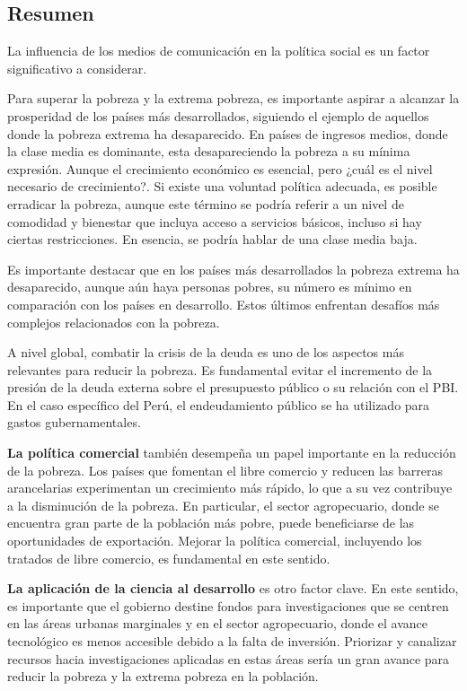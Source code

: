 \documentclass[
  letterpaper,
  DIV=11,
  numbers=noendperiod]{scrartcl}
\begin{document}
\hypertarget{resumen-1}{%
\subsection{Resumen}\label{resumen-1}}

La influencia de los medios de comunicación en la política social es un
factor significativo a considerar.

Para superar la pobreza y la extrema pobreza, es importante aspirar a
alcanzar la prosperidad de los países más desarrollados, siguiendo el
ejemplo de aquellos donde la pobreza extrema ha desaparecido. En países
de ingresos medios, donde la clase media es dominante, esta
desapareciendo la pobreza a su mínima expresión. Aunque el crecimiento
económico es esencial, pero ¿cuál es el nivel necesario de crecimiento?.
Si existe una voluntad política adecuada, es posible erradicar la
pobreza, aunque este término se podría referir a un nivel de comodidad y
bienestar que incluya acceso a servicios básicos, incluso si hay ciertas
restricciones. En esencia, se podría hablar de una clase media baja.

Es importante destacar que en los países más desarrollados la pobreza
extrema ha desaparecido, aunque aún haya personas pobres, su número es
mínimo en comparación con los países en desarrollo. Estos últimos
enfrentan desafíos más complejos relacionados con la pobreza.

A nivel global, combatir la crisis de la deuda es uno de los aspectos
más relevantes para reducir la pobreza. Es fundamental evitar el
incremento de la presión de la deuda externa sobre el presupuesto
público o su relación con el PBI. En el caso específico del Perú, el
endeudamiento público se ha utilizado para gastos gubernamentales.

\textbf{La política comercial} también desempeña un papel importante en
la reducción de la pobreza. Los países que fomentan el libre comercio y
reducen las barreras arancelarias experimentan un crecimiento más
rápido, lo que a su vez contribuye a la disminución de la pobreza. En
particular, el sector agropecuario, donde se encuentra gran parte de la
población más pobre, puede beneficiarse de las oportunidades de
exportación. Mejorar la política comercial, incluyendo los tratados de
libre comercio, es fundamental en este sentido.

\textbf{La aplicación de la ciencia al desarrollo} es otro factor clave.
En este sentido, es importante que el gobierno destine fondos para
investigaciones que se centren en las áreas urbanas marginales y en el
sector agropecuario, donde el avance tecnológico es menos accesible
debido a la falta de inversión. Priorizar y canalizar recursos hacia
investigaciones aplicadas en estas áreas sería un gran avance para
reducir la pobreza y la extrema pobreza en la población.
\end{document}

